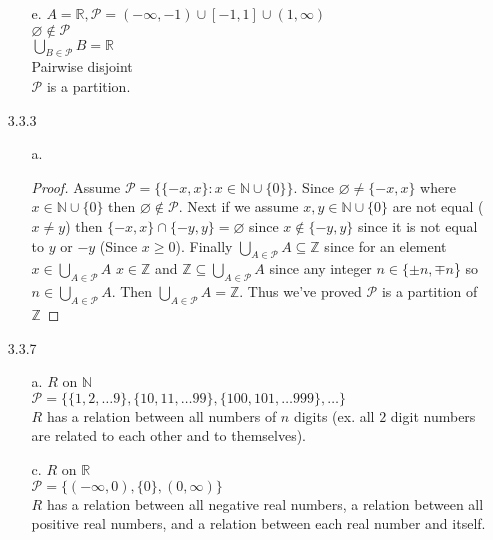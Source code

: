 \documentclass[11pt]{amsart}
\theoremstyle{definition}
\begin{document}
\begin{itemize}
\begin{itemize}
    \item[e.] $A=\mathbb{R},\mathscr{P}=(-\infty,-1)\cup[-1,1]\cup(1,\infty)$ \\
              $\varnothing\notin\mathscr{P}$ \\
              $\bigcup_{B\in\mathscr{P}}B=\mathbb{R}$ \\
              Pairwise disjoint \\
              $\mathscr{P}$ is a partition.

\end{itemize}

\item[3.3.3]
\begin{itemize}
    \item[a.] \begin{proof}
        Assume $\mathscr{P}=\{\{-x,x\}:x\in\mathbb{N}\cup\{0\}\}$. Since $\varnothing\ne \{-x,x\}$ where $x\in\mathbb{N}\cup\{0\}$ then $\varnothing\notin\mathscr{P}$. Next if we assume $x,y\in\mathbb{N}\cup\{0\}$ are not equal ($x\ne y$) then $\{-x,x\}\cap\{-y,y\}=\varnothing$ since $x\notin\{-y,y\}$ since it is not equal to $y$ or $-y$ (Since $x\ge 0$). Finally $\bigcup_{A\in\mathscr{P}}A\subseteq\mathbb{Z}$ since for an element $x\in\bigcup_{A\in\mathscr{P}}A$ $x\in\mathbb{Z}$ and $\mathbb{Z}\subseteq\bigcup_{A\in\mathscr{P}}A$ since any integer $n\in \{\pm n,\mp n$\} so $n\in\bigcup_{A\in\mathscr{P}}A$. Then $\bigcup_{A\in\mathscr{P}}A=\mathbb{Z}$. Thus we've proved $\mathscr{P}$ is a partition of $\mathbb{Z}$
    \end{proof}

\end{itemize}

\item[3.3.7]
\begin{itemize}
    \item[a.] $R\text{ on }\mathbb{N}$ \\
              $\mathscr{P}=\{\{1,2,\ldots 9\},\{10,11,\ldots 99\},\{100,101,\ldots 999\},\ldots\}$ \\
              $R$ has a relation between all numbers of $n$ digits (ex. all $2$ digit numbers are related to each other and to themselves).

    \item[c.] $R\text{ on }\mathbb{R}$ \\
              $\mathscr{P}=\{(-\infty,0),\{0\},(0,\infty)\}$ \\
              $R$ has a relation between all negative real numbers, a relation between all positive real numbers, and a relation between each real number and itself.


\end{itemize}
\end{itemize}
\end{document}
